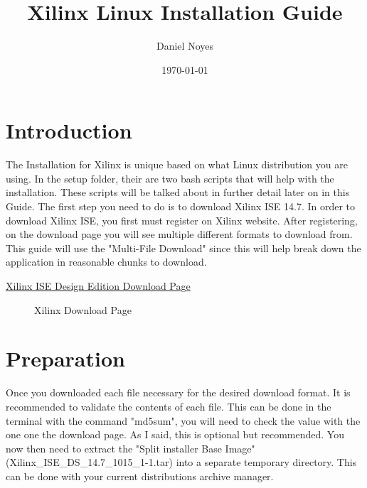 \documentclass[letter]{article}
\begin{document}
\title{Xilinx Linux Installation Guide}
\author{Daniel Noyes}
\date{\today}
\maketitle
{}

\section{Introduction}
The Installation for Xilinx is unique based on what Linux distribution you are using. In the setup folder, their are two bash scripts that will help with the installation. These scripts will be talked about in further detail later on in this Guide. The first step you need to do is to download Xilinx ISE 14.7. In order to download Xilinx ISE, you first must register on Xilinx website. After registering, on the download page you will see multiple different formats to download from. This guide will use the "Multi-File Download" since this will help break down the application in reasonable chunks to download.

\begin{center}
	\href{http://www.xilinx.com/support/download/index.html/content/xilinx/en/downloadNav/design-tools.html}{Xilinx ISE Design Edition Download Page}
\end{center}

\begin{figure}[!htbp]
  \centering
  \caption{\texttrademark Xilinx Download Page}
\end{figure}

\section{Preparation}
Once you downloaded each file necessary for the desired download format. It is recommended to validate the contents of each file. This can be done in the terminal with the command "md5sum", you will need to check the value with the one one the download page. As I said, this is optional but recommended. You now then need to extract the "Split installer Base Image"(Xilinx\_ISE\_DS\_14.7\_1015\_1-1.tar) into a separate temporary directory. This can be done with your current distributions archive manager.
\end{document}
